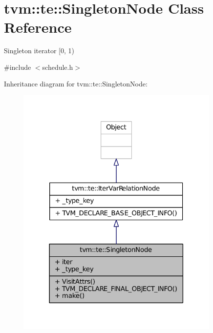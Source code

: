 \hypertarget{classtvm_1_1te_1_1SingletonNode}{}\section{tvm\+:\+:te\+:\+:Singleton\+Node Class Reference}
\label{classtvm_1_1te_1_1SingletonNode}


Singleton iterator \mbox{[}0, 1)  




{\ttfamily \#include $<$schedule.\+h$>$}



Inheritance diagram for tvm\+:\+:te\+:\+:Singleton\+Node\+:
\nopagebreak
\begin{figure}[H]
\begin{center}
\leavevmode
\includegraphics[width=285pt]{classtvm_1_1te_1_1SingletonNode__inherit__graph}
\end{center}
\end{figure}


